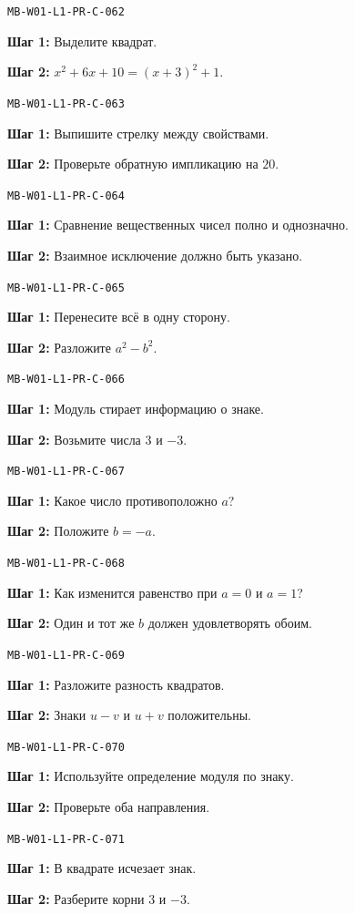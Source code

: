 \documentclass[11pt,a4paper,openany]{book}
\newcommand{\muid}[1]{\texttt{\footnotesize #1}}
\begin{document}
\noindent\muid{MB-W01-L1-PR-C-062}\par 
\textbf{Шаг 1:} Выделите квадрат.\par \textbf{Шаг 2:} $x^2+6x+10=(x+3)^2+1$.\smallskip

\noindent\muid{MB-W01-L1-PR-C-063}\par 
\textbf{Шаг 1:} Выпишите стрелку между свойствами.\par \textbf{Шаг 2:} Проверьте обратную импликацию на $20$.\smallskip

\noindent\muid{MB-W01-L1-PR-C-064}\par 
\textbf{Шаг 1:} Сравнение вещественных чисел полно и однозначно.\par \textbf{Шаг 2:} Взаимное исключение должно быть указано.\smallskip

\noindent\muid{MB-W01-L1-PR-C-065}\par 
\textbf{Шаг 1:} Перенесите всё в одну сторону.\par \textbf{Шаг 2:} Разложите $a^2-b^2$.\smallskip

\noindent\muid{MB-W01-L1-PR-C-066}\par 
\textbf{Шаг 1:} Модуль стирает информацию о знаке.\par \textbf{Шаг 2:} Возьмите числа $3$ и $-3$.\smallskip

\noindent\muid{MB-W01-L1-PR-C-067}\par 
\textbf{Шаг 1:} Какое число противоположно $a$?\par \textbf{Шаг 2:} Положите $b=-a$.\smallskip

\noindent\muid{MB-W01-L1-PR-C-068}\par 
\textbf{Шаг 1:} Как изменится равенство при $a=0$ и $a=1$?\par \textbf{Шаг 2:} Один и тот же $b$ должен удовлетворять обоим.\smallskip

\noindent\muid{MB-W01-L1-PR-C-069}\par 
\textbf{Шаг 1:} Разложите разность квадратов.\par \textbf{Шаг 2:} Знаки $u-v$ и $u+v$ положительны.\smallskip

\noindent\muid{MB-W01-L1-PR-C-070}\par 
\textbf{Шаг 1:} Используйте определение модуля по знаку.\par \textbf{Шаг 2:} Проверьте оба направления.\smallskip

\noindent\muid{MB-W01-L1-PR-C-071}\par 
\textbf{Шаг 1:} В квадрате исчезает знак.\par \textbf{Шаг 2:} Разберите корни $3$ и $-3$.\smallskip
\end{document}

